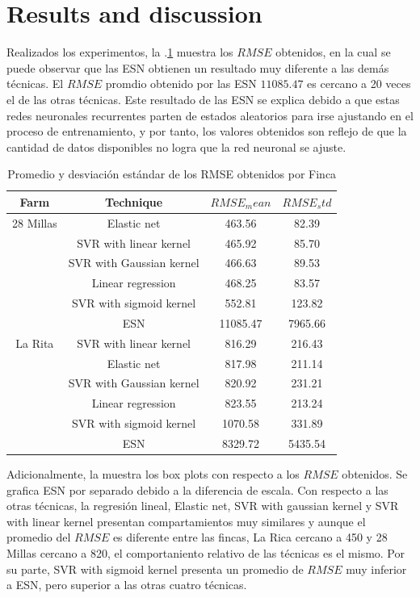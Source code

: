 \section{Results and discussion}
\label{sec:results}

Realizados los experimentos, la \tablename $.$\ref{tabla2} muestra los $RMSE$ obtenidos, en la cual se puede observar que las ESN obtienen un resultado muy diferente a las demás técnicas. El $RMSE$ promdio obtenido por las ESN $11085.47$ es cercano a 20 veces el de las otras técnicas. Este resultado de las ESN se explica debido a que estas redes neuronales recurrentes parten de estados aleatorios para irse ajustando en el proceso de entrenamiento, y por tanto, los valores obtenidos son reflejo de que la cantidad de datos disponibles no logra que la red neuronal se ajuste.
%
\begin{table}[h] 
\caption{Promedio y desviación estándar de los RMSE obtenidos por Finca} 
\label{tabla2} 
\centering
\begin{tabular}{c|c|c|c} 
\hline
\bfseries Farm & \bfseries Technique & \bfseries $RMSE_mean$ & \bfseries $RMSE_std$\\ 
\hline\hline 
28 Millas  	& Elastic net  & 463.56	& 	82.39  \\
			& SVR with linear kernel  & 465.92  & 85.70  \\
			& SVR with Gaussian kernel  & 466.63 & 89.53  \\						
			& Linear regression  & 468.25 & 83.57  \\									
			& SVR with sigmoid kernel & 552.81 & 123.82  \\									
			& ESN  & 11085.47 &  7965.66 \\												
\hline 
La Rita  	& SVR with linear kernel  & 816.29	& 	216.43  \\
			& Elastic net   &  817.98 &  211.14 \\
			& SVR with Gaussian kernel  & 820.92 & 231.21  \\						
			& Linear regression  & 823.55 &  213.24 \\									
			& SVR with sigmoid kernel & 1070.58 &  331.89 \\									
			& ESN  & 8329.72 & 5435.54  \\												
\hline    
\end{tabular} 
\end{table}
%
Adicionalmente, la  muestra los box plots con respecto a los $RMSE$ obtenidos. Se grafica ESN por separado debido a la diferencia de escala. Con respecto a las otras técnicas, la regresión lineal, Elastic net, SVR with gaussian kernel y SVR with linear kernel presentan compartamientos muy similares y aunque el promedio del $RMSE$ es diferente entre las fincas, La Rica cercano a 450 y 28 Millas cercano a 820, el comportaniento relativo de las técnicas es el mismo. Por su parte, SVR with sigmoid kernel presenta un promedio de $RMSE$ muy inferior a ESN, pero superior a las otras cuatro técnicas.
